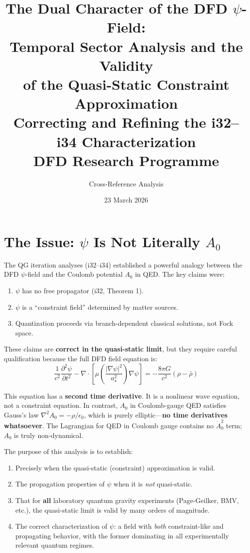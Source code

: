 \documentclass[12pt,a4paper]{article}
\title{The Dual Character of the DFD $\psi$-Field:\\
Temporal Sector Analysis and the Validity\\
of the Quasi-Static Constraint Approximation\\[6pt]
\large Correcting and Refining the i32--i34 Characterization\\[6pt]
\normalsize DFD Research Programme}
\author{Cross-Reference Analysis}
\date{23 March 2026}
\begin{document}
\maketitle
\tableofcontents
\newpage

\section{The Issue: $\psi$ Is Not Literally $A_0$}
\label{sec:issue}

The QG iteration analyses (i32--i34) established a powerful analogy between
the DFD $\psi$-field and the Coulomb potential $A_0$ in QED. The key claims
were:
\begin{enumerate}
\item $\psi$ has no free propagator (i32, Theorem 1).
\item $\psi$ is a ``constraint field'' determined by matter sources.
\item Quantization proceeds via branch-dependent classical solutions, not
      Fock space.
\end{enumerate}

These claims are \textbf{correct in the quasi-static limit}, but they require
careful qualification because the full DFD field equation is:
\begin{equation}\label{eq:full-dfd}
\boxed{\frac{1}{c^2}\frac{\partial^2\psi}{\partial t^2}
- \nabla\cdot\!\left[\mu\!\left(\frac{|\nabla\psi|^2}{a_\star^2}\right)
\nabla\psi\right]
= -\frac{8\pi G}{c^2}(\rho - \bar\rho)}
\end{equation}

This equation has a \textbf{second time derivative}. It is a nonlinear wave
equation, not a constraint equation. In contrast, $A_0$ in Coulomb-gauge QED
satisfies Gauss's law $\nabla^2 A_0 = -\rho/\epsilon_0$, which is purely
elliptic---\textbf{no time derivatives whatsoever}. The Lagrangian for QED
in Coulomb gauge contains no $\dot{A}_0^2$ term; $A_0$ is truly
non-dynamical.

The purpose of this analysis is to establish:
\begin{enumerate}
\item Precisely when the quasi-static (constraint) approximation is valid.
\item The propagation properties of $\psi$ when it is \emph{not} quasi-static.
\item That for \textbf{all} laboratory quantum gravity experiments (Page-Geilker,
      BMV, etc.), the quasi-static limit is valid by many orders of magnitude.
\item The correct characterization of $\psi$: a field with \emph{both}
      constraint-like and propagating behavior, with the former dominating in
      all experimentally relevant quantum regimes.
\end{enumerate}
\end{document}
